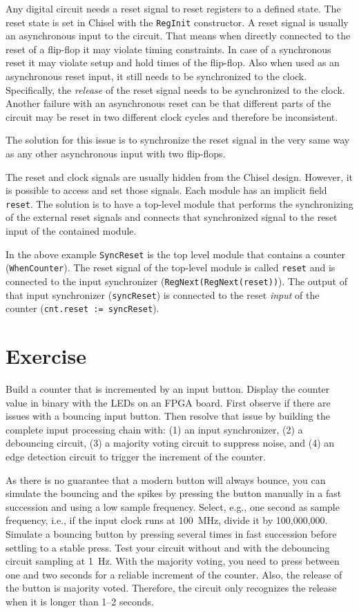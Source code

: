 \documentclass[%
    10pt,
    headinclude, footexclude,
    openright, %
    notitlepage,
    cleardoubleempty,
    headsepline,
    pointlessnumbers,
    bibtotoc, idxtotoc,
    ]{scrbook}
\newcommand{\code}[1]{{\lstinline[basicstyle=\small\ttfamily]{#1}}}
\begin{document}
Any digital circuit needs a reset signal to reset registers to a defined state. The reset state is
set in Chisel with the \code{RegInit} constructor. A reset signal is usually an asynchronous
input to the circuit. That means when directly connected to the reset of a flip-flop it may
violate timing constraints. In case of a synchronous reset it may violate setup and hold times
of the flip-flop. Also when used as an asynchronous reset input, it still needs to be synchronized
to the clock. Specifically, the \emph{release} of the reset signal needs to be synchronized to the clock.
Another failure with an asynchronous reset can be that different parts of the circuit may be
reset in two different clock cycles and therefore be inconsistent.

The solution for this issue is to synchronize the reset signal in the very same way as
any other asynchronous input with two flip-flops.

The reset and clock signals are usually hidden from the Chisel design.
However, it is possible to access and set those signals. Each module has an implicit field
\code{reset}. The solution is to have a top-level module that performs the synchronizing
of the external reset signals and connects that synchronized signal to the reset input
of the contained module.


In the above example \code{SyncReset} is the top level module that contains a
counter (\code{WhenCounter}). The reset signal of the top-level module is called
\code{reset} and is connected to the input synchronizer (\code{RegNext(RegNext(reset))}).
The output of that input synchronizer (\code{syncReset}) is connected to the reset \emph{input}
of the counter (\code{cnt.reset := syncReset}).


\section{Exercise}

Build a counter that is incremented by an input button.
Display the counter value in binary with the LEDs on an FPGA board.
First observe if there are issues with a bouncing input button.
Then resolve that issue by building
the complete input processing chain with: (1) an input synchronizer,
(2) a debouncing circuit, (3) a majority voting circuit to suppress noise,
and (4) an edge detection circuit to trigger the increment of the counter.

As there is no guarantee that a modern button will always bounce, you can
simulate the bouncing and the spikes by pressing the button manually in a fast succession
and using a low sample frequency. Select, e.g., one second as sample frequency,
i.e., if the input clock runs at 100~MHz, divide it by 100,000,000.
Simulate a bouncing button by pressing several times in fast succession
before settling to a stable press. Test your circuit without and with the
debouncing circuit sampling at 1~Hz.
With the majority voting, you need to press between one and two seconds
for a reliable increment of the counter. Also, the release of the button is
majority voted. Therefore, the circuit only recognizes the release when it is
longer than 1--2 seconds.
\end{document}
